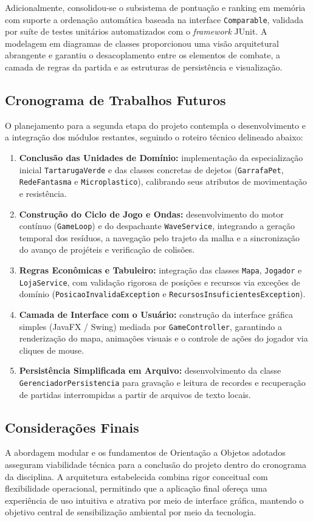 \documentclass[11pt,a4paper]{article}
\begin{document}
Adicionalmente, consolidou-se o subsistema de pontuação e ranking em memória com suporte a ordenação automática baseada na interface \texttt{Comparable}, validada por suíte de testes unitários automatizados com o \textit{framework} JUnit. A modelagem em diagramas de classes proporcionou uma visão arquitetural abrangente e garantiu o desacoplamento entre os elementos de combate, a camada de regras da partida e as estruturas de persistência e visualização.

\subsection*{Cronograma de Trabalhos Futuros}
O planejamento para a segunda etapa do projeto contempla o desenvolvimento e a integração dos módulos restantes, seguindo o roteiro técnico delineado abaixo:
\begin{enumerate}
    \item \textbf{Conclusão das Unidades de Domínio:} implementação da especialização inicial \texttt{TartarugaVerde} e das classes concretas de dejetos (\texttt{GarrafaPet}, \texttt{RedeFantasma} e \texttt{Microplastico}), calibrando seus atributos de movimentação e resistência.
    \item \textbf{Construção do Ciclo de Jogo e Ondas:} desenvolvimento do motor contínuo (\texttt{GameLoop}) e do despachante \texttt{WaveService}, integrando a geração temporal dos resíduos, a navegação pelo trajeto da malha e a sincronização do avanço de projéteis e verificação de colisões.
    \item \textbf{Regras Econômicas e Tabuleiro:} integração das classes \texttt{Mapa}, \texttt{Jogador} e \texttt{LojaService}, com validação rigorosa de posições e recursos via exceções de domínio (\texttt{PosicaoInvalidaException} e \texttt{RecursosInsuficientesException}).
    \item \textbf{Camada de Interface com o Usuário:} construção da interface gráfica simples (JavaFX / Swing) mediada por \texttt{GameController}, garantindo a renderização do mapa, animações visuais e o controle de ações do jogador via cliques de mouse.
    \item \textbf{Persistência Simplificada em Arquivo:} desenvolvimento da classe \texttt{GerenciadorPersistencia} para gravação e leitura de recordes e recuperação de partidas interrompidas a partir de arquivos de texto locais.
\end{enumerate}

\subsection*{Considerações Finais}
A abordagem modular e os fundamentos de Orientação a Objetos adotados asseguram viabilidade técnica para a conclusão do projeto dentro do cronograma da disciplina. A arquitetura estabelecida combina rigor conceitual com flexibilidade operacional, permitindo que a aplicação final ofereça uma experiência de uso intuitiva e atrativa por meio de interface gráfica, mantendo o objetivo central de sensibilização ambiental por meio da tecnologia.
\end{document}
